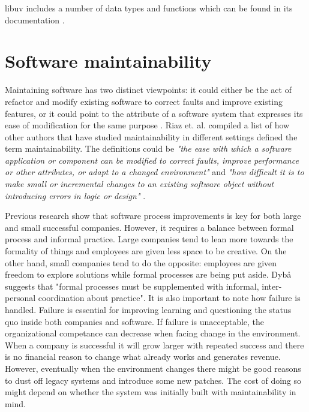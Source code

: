 libuv includes a number of data types and functions which can be found in its
documentation \cite{libuv-docs}.

\section{Software maintainability}

Maintaining software has two distinct viewpoints: it could either be the act of
refactor and modify existing software to correct faults and improve existing
features, or it could point to the attribute of a software system that
expresses its ease of modification for the same purpose \cite{radatz1990ieee}.
Riaz et. al. \cite{riaz2009systematic} compiled a list of how other authors
that have studied maintainability in different settings defined the term
maintainability. The definitions could be \textit{"the ease with which a
software application or component can be modified to correct faults, improve
performance or other attributes, or adapt to a changed environment"} and
\textit{"how difficult it is to make small or incremental changes to an
existing software object without introducing errors in logic or design"}
\cite{riaz2009systematic}.


Previous research show that software process improvements is key for both large
and small successful companies. However, it requires a balance between formal
process and informal practice. Large companies tend to lean more towards the
formality of things and employees are given less space to be creative. On the
other hand, small companies tend to do the opposite: employees are given
freedom to explore solutions while formal processes are being put aside. Dybå
\cite{dybaa2003factors} suggests that "formal processes must be supplemented
with informal, inter-personal coordination about practice". It is also
important to note how failure is handled. Failure is essential for improving
learning and questioning the status quo inside both companies and software. If
failure is unacceptable, the organizational competance can decrease when facing
change in the environment. When a company is successful it will grow larger
with repeated success and there is no financial reason to change what already
works and generates revenue. However, eventually when the environment changes
there might be good reasons to dust off legacy systems and introduce some new
patches. The cost of doing so might depend on whether the system was initially
built with maintainability in mind. \cite{dybaa2003factors}

